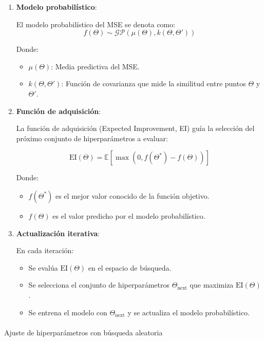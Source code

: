 \documentclass[
  12pt,
  letterpaper,
  DIV=11,
  numbers=noendperiod]{scrartcl}
\makeatletter
\let\oldparagraph\paragraph
\renewcommand{\paragraph}{
    \@ifstar
      \xxxParagraphStar
      \xxxParagraphNoStar
  }
\newcommand{\xxxParagraphStar}[1]{\oldparagraph*{#1}\mbox{}}
\newcommand{\xxxParagraphNoStar}[1]{\oldparagraph{#1}\mbox{}}
\makeatother
\begin{document}
\begin{enumerate}
\def\labelenumi{\arabic{enumi}.}
\item
  \textbf{Modelo probabilístico}:

  El modelo probabilístico del MSE se denota como: \[
  f(\Theta) \sim \mathcal{GP}(\mu(\Theta), k(\Theta, \Theta'))
  \]

  Donde:

  \begin{itemize}
  \item
    \(\mu(\Theta)\): Media predictiva del MSE.
  \item
    \(k(\Theta, \Theta')\): Función de covarianza que mide la similitud
    entre puntos \(\Theta\) y \(\Theta'\).
  \end{itemize}
\item
  \textbf{Función de adquisición}:

  La función de adquisición (Expected Improvement, EI) guía la selección
  del próximo conjunto de hiperparámetros a evaluar:

  \[
  \text{EI}(\Theta) = \mathbb{E}\left[ \max(0, f(\Theta^*) - f(\Theta)) \right]
  \]

  Donde:

  \begin{itemize}
  \item
    \(f(\Theta^*)\) es el mejor valor conocido de la función objetivo.
  \item
    \(f(\Theta)\) es el valor predicho por el modelo probabilístico.
  \end{itemize}
\item
  \textbf{Actualización iterativa}:

  En cada iteración:

  \begin{itemize}
  \item
    Se evalúa \(\text{EI}(\Theta)\) en el espacio de búsqueda.
  \item
    Se selecciona el conjunto de hiperparámetros
    \(\Theta_{\text{next}}\) que maximiza \(\text{EI}(\Theta)\).
  \item
    Se entrena el modelo con \(\Theta_{\text{next}}\) y se actualiza el
    modelo probabilístico.
  \end{itemize}
\end{enumerate}

\paragraph{Ajuste de hiperparámetros con búsqueda
aleatoria}\label{ajuste-de-hiperparuxe1metros-con-buxfasqueda-aleatoria}
\end{document}
